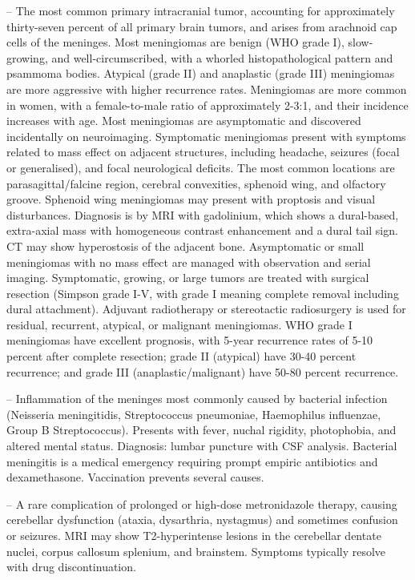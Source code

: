 -- The most common primary intracranial tumor, accounting for approximately thirty-seven percent of all primary brain tumors, and arises from arachnoid cap cells of the meninges. Most meningiomas are benign (WHO grade I), slow-growing, and well-circumscribed, with a whorled histopathological pattern and psammoma bodies. Atypical (grade II) and anaplastic (grade III) meningiomas are more aggressive with higher recurrence rates. Meningiomas are more common in women, with a female-to-male ratio of approximately 2-3:1, and their incidence increases with age. Most meningiomas are asymptomatic and discovered incidentally on neuroimaging. Symptomatic meningiomas present with symptoms related to mass effect on adjacent structures, including headache, seizures (focal or generalised), and focal neurological deficits. The most common locations are parasagittal/falcine region, cerebral convexities, sphenoid wing, and olfactory groove. Sphenoid wing meningiomas may present with proptosis and visual disturbances. Diagnosis is by MRI with gadolinium, which shows a dural-based, extra-axial mass with homogeneous contrast enhancement and a dural tail sign. CT may show hyperostosis of the adjacent bone. Asymptomatic or small meningiomas with no mass effect are managed with observation and serial imaging. Symptomatic, growing, or large tumors are treated with surgical resection (Simpson grade I-V, with grade I meaning complete removal including dural attachment). Adjuvant radiotherapy or stereotactic radiosurgery is used for residual, recurrent, atypical, or malignant meningiomas. WHO grade I meningiomas have excellent prognosis, with 5-year recurrence rates of 5-10 percent after complete resection; grade II (atypical) have 30-40 percent recurrence; and grade III (anaplastic/malignant) have 50-80 percent recurrence.

-- Inflammation of the meninges most commonly caused by bacterial infection (Neisseria meningitidis, Streptococcus pneumoniae, Haemophilus influenzae, Group B Streptococcus). Presents with fever, nuchal rigidity, photophobia, and altered mental status. Diagnosis: lumbar puncture with CSF analysis. Bacterial meningitis is a medical emergency requiring prompt empiric antibiotics and dexamethasone. Vaccination prevents several causes.

-- A rare complication of prolonged or high-dose metronidazole therapy, causing cerebellar dysfunction (ataxia, dysarthria, nystagmus) and sometimes confusion or seizures. MRI may show T2-hyperintense lesions in the cerebellar dentate nuclei, corpus callosum splenium, and brainstem. Symptoms typically resolve with drug discontinuation.

